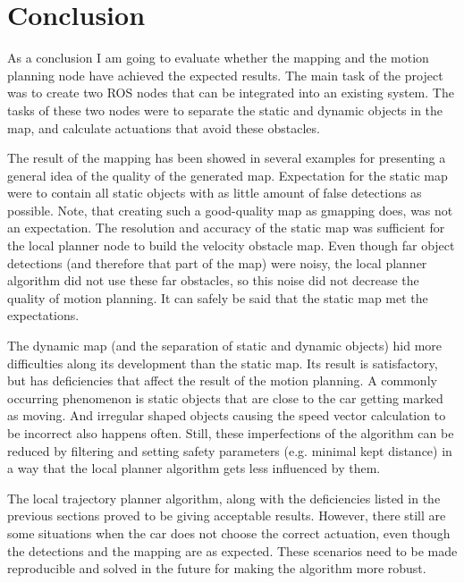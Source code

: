 \chapter{Conclusion}
\label{chap:conclusion}

As a conclusion I am going to evaluate whether the mapping and the motion planning node have achieved the expected results. The main task of the project was to create two ROS nodes that can be integrated into an existing system. The tasks of these two nodes were to separate the static and dynamic objects in the map, and calculate actuations that avoid these obstacles.

The result of the mapping has been showed in several examples for presenting a general idea of the quality of the generated map. Expectation for the static map were to contain all static objects with as little amount of false detections as possible. Note, that creating such a good-quality map as gmapping does, was not an expectation. The resolution and accuracy of the static map was sufficient for the local planner node to build the velocity obstacle map. Even though far object detections (and therefore that part of the map) were noisy, the local planner algorithm did not use these far obstacles, so this noise did not decrease the quality of motion planning. It can safely be said that the static map met the expectations.

The dynamic map (and the separation of static and dynamic objects) hid more difficulties along its development than the static map. Its result is satisfactory, but has deficiencies that affect the result of the motion planning. A commonly occurring phenomenon is static objects that are close to the car getting marked as moving. And irregular shaped objects causing the speed vector calculation to be incorrect also happens often. Still, these imperfections of the algorithm can be reduced by filtering and setting safety parameters (e.g. minimal kept distance) in a way that the local planner algorithm gets less influenced by them.

The local trajectory planner algorithm, along with the deficiencies listed in the previous sections proved to be giving acceptable results. However, there still are some situations when the car does not choose the correct actuation, even though the detections and the mapping are as expected. These scenarios need to be made reproducible and solved in the future for making the algorithm more robust.

